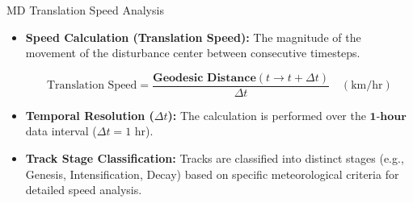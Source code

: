\documentclass[aspectratio=169,t,xcolor=table]{beamer}
\begin{document}
\begin{frame}{MD Translation Speed Analysis}
	\vspace{-0.4cm}
	\footnotesize
	\begin{itemize}
		\item \textbf{Speed Calculation (Translation Speed):} The magnitude of the movement of the disturbance center between consecutive timesteps.
		      \begin{center}
			      $$\text{Translation Speed} = \frac{\textbf{Geodesic Distance} (t \to t+\Delta t)}{\Delta t} \quad (\text{km/hr})$$
		      \end{center}
		\item \textbf{Temporal Resolution ($\Delta t$):} The calculation is performed over the $\mathbf{1\text{-hour}}$ data interval ($\Delta t = 1\text{ hr}$).
		\item \textbf{Track Stage Classification:} Tracks are classified into distinct stages (e.g., Genesis, Intensification, Decay) based on specific meteorological criteria for detailed speed analysis.
	\end{itemize}


\end{frame}
\end{document}
